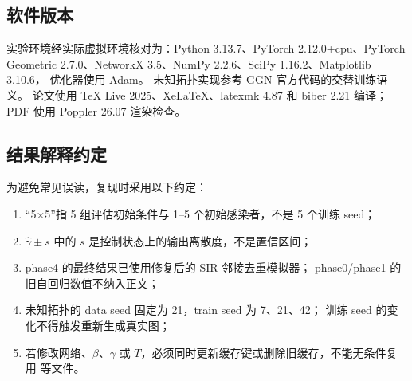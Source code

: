 \subsection{软件版本}

实验环境经实际虚拟环境核对为：Python 3.13.7、PyTorch 2.12.0+cpu\cite{paszke2019}、PyTorch Geometric 2.7.0\cite{fey2019}、NetworkX 3.5\cite{hagberg2008}、NumPy 2.2.6、SciPy 1.16.2、Matplotlib 3.10.6，
优化器使用 Adam\cite{kingma2015adam}。
未知拓扑实现参考 GGN 官方代码的交替训练语义\cite{ggncode}。
论文使用 TeX Live 2025、XeLaTeX、latexmk 4.87 和 biber 2.21 编译；
PDF 使用 Poppler 26.07 渲染检查。

\subsection{结果解释约定}

为避免常见误读，复现时采用以下约定：
\begin{enumerate}
  \item “5×5”指 5 组评估初始条件与 1--5 个初始感染者，不是 5 个训练 seed；
  \item $\hat\gamma\pm s$ 中的 $s$ 是控制状态上的输出离散度，不是置信区间；
  \item phase4 的最终结果已使用修复后的 SIR 邻接去重模拟器；
phase0/phase1 的旧自回归数值不纳入正文；
  \item 未知拓扑的 data seed 固定为 21，train seed 为 7、21、42；
训练 seed 的变化不得触发重新生成真实图；
  \item 若修改网络、$\beta$、$\gamma$ 或 $T$，必须同时更新缓存键或删除旧缓存，不能无条件复用  等文件。
\end{enumerate}
